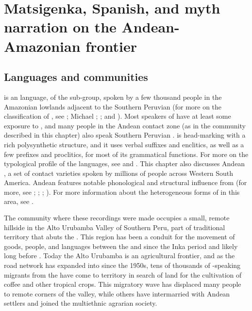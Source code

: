\documentclass[output=paper]{LSP/langsci}
\begin{document}
\section{Matsigenka, Spanish, and myth narration on the Andean-Amazonian frontier}
\label{Emmayth.narration}
\subsection{Languages and communities}
\label{Emland.comm}
 is an  language, of the  sub-group, spoken by a few thousand people in the Amazonian lowlands adjacent to the Southern Peruvian  (for more on the classification of , see \citealt{aikhenvald1999}; Micha\-el \citeyear[212--219]{michael08}; \citealt{michael10}; and \citealt{payne81}). Most speakers of  have at least some exposure to , and many people in the Andean contact zone (as in the community described in this chapter) also speak Southern Peruvian  \citep{emlen.2017}.  is head-marking with a rich polysynthetic structure, and it uses verbal suffixes and enclitics, as well as a few prefixes and proclitics, for most of its grammatical functions. For more on the typological profile of the  languages, see \citet{michael08} and \citet{mihas15}. This chapter also discusses Andean , a set of contact varieties spoken by millions of people across Western South America. Andean  features notable phonological and structural influence from  (for more, see \citealt[][593--595]{adelaar2004}; \citealt{babel18}; \citealt{cerron03}; \citealt{escobar03}). For more information about the heterogeneous forms of  in this area, see \citet{emlenforth}.
 
The community where these recordings were made occupies a small, remote hillside in the  {Alto Urubamba} Valley of Southern Peru, part of traditional  territory that abuts the . This region has been a conduit for the movement of goods, people, and languages between the  and  since the Inka period and likely long before \citep{Gade1972,camino.1977}. Today the {Alto Urubamba} is an agricultural frontier, and as the road network has expanded into  since the 1950s, tens of thousands of -speaking migrants from the  have come to  territory in search of land for the cultivation of coffee and other tropical crops. This migratory wave has displaced many  people to remote corners of the valley, while others have intermarried with Andean settlers and joined the multiethnic agrarian society.
\end{document}
